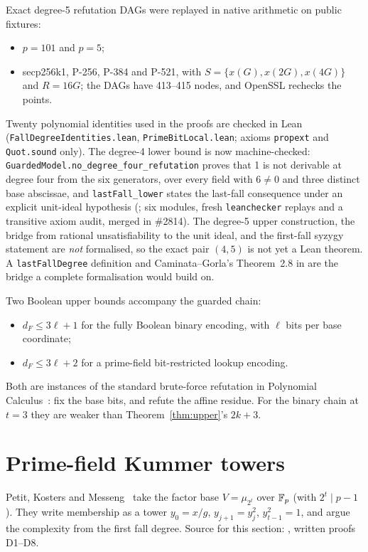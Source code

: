 Exact degree-5 refutation DAGs were replayed in native arithmetic on public
fixtures:
\begin{itemize}
\item $p=101$ and $p=5$;
\item secp256k1, P-256, P-384 and P-521, with $S=\{x(G),x(2G),x(4G)\}$ and
  $R=16G$; the DAGs have 413--415 nodes, and OpenSSL rechecks the points.
\end{itemize}
Twenty polynomial identities used in the proofs are checked in Lean
(\texttt{FallDegreeIdentities.lean}, \texttt{PrimeBitLocal.lean}; axioms
\texttt{propext} and \texttt{Quot.sound} only). The degree-4 lower bound
is now machine-checked: \texttt{GuardedModel.no\_degree\_four\_refutation}
proves that 1 is not derivable at degree four from the six generators, over
every field with $6\ne0$ and three distinct base abscissae, and
\texttt{lastFall\_lower} states the last-fall consequence under an explicit
unit-ideal hypothesis (;
six modules, fresh \texttt{leanchecker} replays and a transitive axiom audit,
merged in \#2814). The degree-5 upper construction, the bridge from rational
unsatisfiability to the unit ideal, and the first-fall syzygy statement are
\emph{not} formalised, so the exact pair $(4,5)$ is not yet a Lean theorem. A
\texttt{lastFallDegree} definition and Caminata--Gorla's Theorem~2.8 in
are the bridge a complete formalisation would build on.

Two Boolean upper bounds accompany the guarded chain:
\begin{itemize}
\item $d_F\le3\ell+1$ for the fully Boolean binary encoding, with $\ell$
  bits per base coordinate;
\item $d_F\le3\ell+2$ for a prime-field bit-restricted lookup encoding.
\end{itemize}
Both are instances of the standard brute-force refutation in Polynomial
Calculus~\cite{cei1996}: fix the base bits, and refute the affine residue.
For the binary chain at $t=3$ they are weaker than Theorem~\ref{thm:upper}'s
$2k+3$.

\section{Prime-field Kummer towers}\label{sec:fd-pkm}

Petit, Kosters and Messeng~\cite{pkm2016} take the factor base
$V=\mu_{2^t}$ over $\mathbb{F}_p$ (with $2^t\mid p-1$). They write membership as a
tower $y_0=x/g$, $y_{j+1}=y_j^2$, $y_{t-1}^2=1$, and argue the complexity
from the first fall degree. Source for this section:
, written proofs D1--D8.

